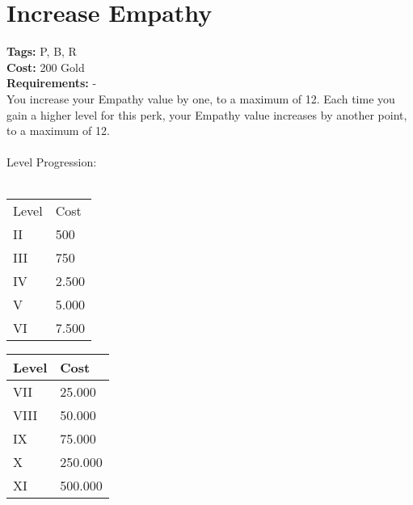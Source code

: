 \section{Increase Empathy}\label{sec:increaseempathy}
\textbf{Tags:} P, B, R\\
\textbf{Cost:} 200 Gold\\
\textbf{Requirements:} -\\
You increase your Empathy value by one, to a maximum of 12.
Each time you gain a higher level for this perk, your Empathy value increases by another point, to a maximum of 12.\\
\\
Level Progression:\\
\\
\begin{minipage}{0.5\textwidth}
    \begin{tabular}{l | l}
        Level & Cost\\
        II & 500\\
        III & 750\\
        IV & 2.500\\
        V & 5.000\\
        VI & 7.500\\
    \end{tabular}
\end{minipage}
\begin{minipage}{0.5\textwidth}
    \begin{tabular}{l | l}
        Level & Cost\\ \hline
        VII & 25.000\\
        VIII & 50.000\\
        IX & 75.000\\
        X & 250.000\\
        XI & 500.000\\
    \end{tabular}
\end{minipage}

